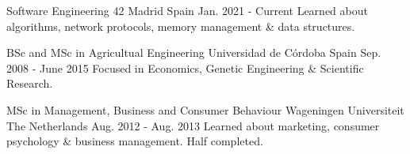
\begin{cventries}

  \cventry
    {Software Engineering} %
    {42 Madrid} %
    {Spain} %
    {Jan. 2021 - Current} %
    {
      {Learned about algorithms, network protocols, memory management \& data structures.}
    }

  \cventry
    {BSc and MSc in Agricultual Engineering} %
    {Universidad de Córdoba} %
    {Spain} %
    {Sep. 2008 - June 2015} %
    {
      {Focused in Economics, Genetic Engineering \& Scientific Research.}
    }

  \cventry
    {MSc in Management, Business and Consumer Behaviour} %
    {Wageningen Universiteit} %
    {The Netherlands} %
    {Aug. 2012 - Aug. 2013} %
    {
      {Learned about marketing, consumer psychology \& business management. Half completed.}
    }

\end{cventries}
